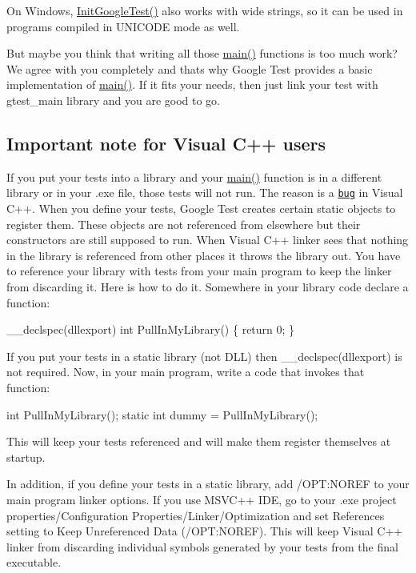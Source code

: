 On Windows, {\ttfamily \hyperlink{namespacetesting_afd726ae08c9bd16dc52f78c822d9946b}{Init\+Google\+Test()}} also works with wide strings, so it can be used in programs compiled in {\ttfamily U\+N\+I\+C\+O\+DE} mode as well.

But maybe you think that writing all those \hyperlink{odom__tracker__node_8cpp_a3c04138a5bfe5d72780bb7e82a18e627}{main()} functions is too much work? We agree with you completely and that\textquotesingle{}s why Google Test provides a basic implementation of \hyperlink{odom__tracker__node_8cpp_a3c04138a5bfe5d72780bb7e82a18e627}{main()}. If it fits your needs, then just link your test with gtest\+\_\+main library and you are good to go.

\subsection*{Important note for Visual C++ users}

If you put your tests into a library and your {\ttfamily \hyperlink{odom__tracker__node_8cpp_a3c04138a5bfe5d72780bb7e82a18e627}{main()}} function is in a different library or in your .exe file, those tests will not run. The reason is a \href{https://connect.microsoft.com/feedback/viewfeedback.aspx?FeedbackID=244410&siteid=210}{\tt bug} in Visual C++. When you define your tests, Google Test creates certain static objects to register them. These objects are not referenced from elsewhere but their constructors are still supposed to run. When Visual C++ linker sees that nothing in the library is referenced from other places it throws the library out. You have to reference your library with tests from your main program to keep the linker from discarding it. Here is how to do it. Somewhere in your library code declare a function\+: 
\begin{DoxyCode}
\_\_declspec(dllexport) int PullInMyLibrary() \{ return 0; \}
\end{DoxyCode}
 If you put your tests in a static library (not D\+LL) then {\ttfamily \+\_\+\+\_\+declspec(dllexport)} is not required. Now, in your main program, write a code that invokes that function\+: 
\begin{DoxyCode}
int PullInMyLibrary();
static int dummy = PullInMyLibrary();
\end{DoxyCode}
 This will keep your tests referenced and will make them register themselves at startup.

In addition, if you define your tests in a static library, add {\ttfamily /\+O\+PT\+:N\+O\+R\+EF} to your main program linker options. If you use M\+S\+V\+C++ I\+DE, go to your .exe project properties/\+Configuration Properties/\+Linker/\+Optimization and set References setting to {\ttfamily Keep Unreferenced Data (/\+O\+PT\+:N\+O\+R\+EF)}. This will keep Visual C++ linker from discarding individual symbols generated by your tests from the final executable.

